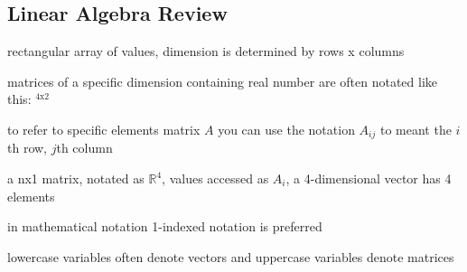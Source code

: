 \documentclass[11pt]{article}
\begin{document}
\subsection{Linear Algebra Review}
\label{sec:orgd51db55}
\begin{description}
\item[{matrix}] rectangular array of values, dimension is determined by rows x columns
\item matrices of a specific dimension containing real number are often
notated like this: \(^{\text{4x2}}\)
\item to refer to specific elements matrix \(A\) you can use the notation
\(A_{ij}\) to meant the \(i\)th row, \(j\)th column
\item[{vector}] a nx1 matrix, notated as \(\mathbb{R}^{4}\), values
accessed as \(A_{i}\), a 4-dimensional vector has 4
elements
\item in mathematical notation 1-indexed notation is preferred
\item lowercase variables often denote vectors and uppercase variables denote matrices
\end{description}
\end{document}
